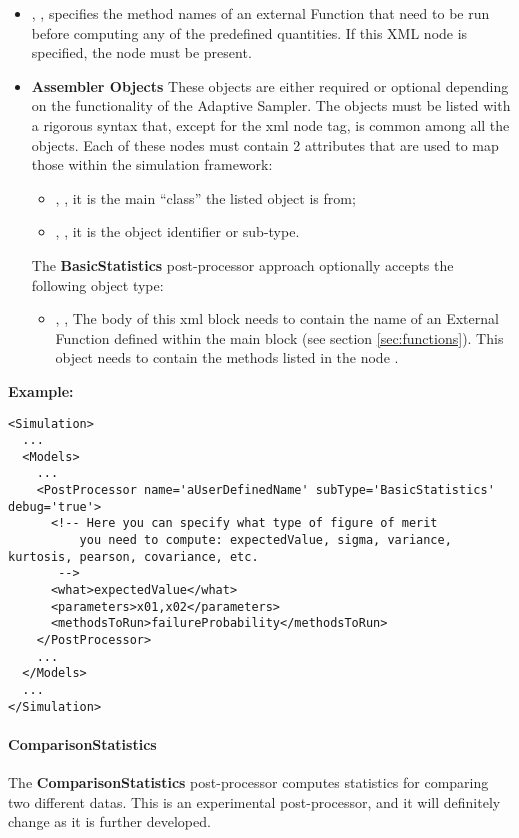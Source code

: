 \begin{itemize}
  \item {}, , specifies the method names of an external Function that need to be run
  before computing any of the predefined quantities.
  If this XML node is specified, the  node must be present.
  \item \textbf{Assembler Objects} These objects are either required or optional
  depending on the functionality of the Adaptive Sampler.
  The objects must be listed with a rigorous syntax that, except for the xml
  node tag, is common among all the objects.
  Each of these nodes must contain 2 attributes that are used to map those
  within the simulation framework:
  \begin{itemize}
    \item {}, , it is the main
    ``class'' the listed object is from;
    \item {}, , it is the object
    identifier or sub-type.
  \end{itemize}
  The \textbf{BasicStatistics} post-processor approach optionally accepts the
  following object type:
  \begin{itemize}
    \item {}, , The body of
    this xml block needs to contain the name of an External Function defined
    within the  main block (see section \ref{sec:functions}).
    This object needs to contain the methods listed in the node
    .
  \end{itemize}
\end{itemize}
\textbf{Example:}
\begin{lstlisting}[style=XML,morekeywords={name,subType,debug}]
<Simulation>
  ...
  <Models>
    ...
    <PostProcessor name='aUserDefinedName' subType='BasicStatistics'  debug='true'>
      <!-- Here you can specify what type of figure of merit
          you need to compute: expectedValue, sigma, variance, kurtosis, pearson, covariance, etc.
       -->
      <what>expectedValue</what>
      <parameters>x01,x02</parameters>
      <methodsToRun>failureProbability</methodsToRun>
    </PostProcessor>
    ...
  </Models>
  ...
</Simulation>
\end{lstlisting}

\paragraph{ComparisonStatistics}
\label{ComparisonStatistics}
The \textbf{ComparisonStatistics} post-processor computes statistics
for comparing two different datas.  This is an experimental
post-processor, and it will definitely change as it is further
developed.


